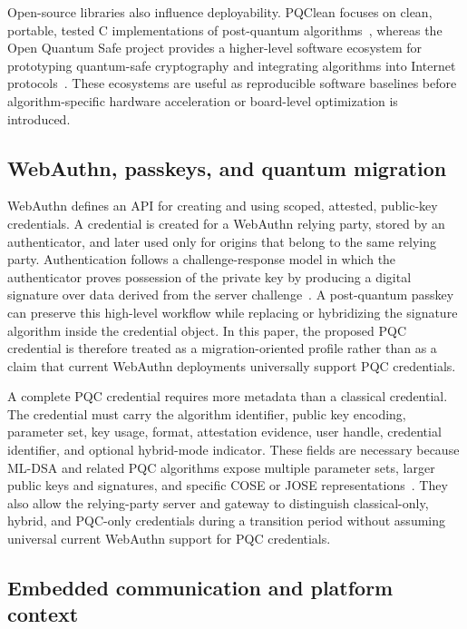 \documentclass[conference,10pt,letterpaper]{IEEEtran}
\begin{document}
Open-source libraries also influence deployability. PQClean focuses on clean, portable, tested C implementations of post-quantum algorithms~\cite{kannwischer2022}, whereas the Open Quantum Safe project provides a higher-level software ecosystem for prototyping quantum-safe cryptography and integrating algorithms into Internet protocols~\cite{stebila2017}. These ecosystems are useful as reproducible software baselines before algorithm-specific hardware acceleration or board-level optimization is introduced.

\subsection{WebAuthn, passkeys, and quantum migration}

WebAuthn defines an API for creating and using scoped, attested, public-key credentials. A credential is created for a WebAuthn relying party, stored by an authenticator, and later used only for origins that belong to the same relying party. Authentication follows a challenge-response model in which the authenticator proves possession of the private key by producing a digital signature over data derived from the server challenge~\cite{webauthn2026}. A post-quantum passkey can preserve this high-level workflow while replacing or hybridizing the signature algorithm inside the credential object. In this paper, the proposed PQC credential is therefore treated as a migration-oriented profile rather than as a claim that current WebAuthn deployments universally support PQC credentials.

A complete PQC credential requires more metadata than a classical credential. The credential must carry the algorithm identifier, public key encoding, parameter set, key usage, format, attestation evidence, user handle, credential identifier, and optional hybrid-mode indicator. These fields are necessary because ML-DSA and related PQC algorithms expose multiple parameter sets, larger public keys and signatures, and specific COSE or JOSE representations~\cite{rfc9964}. They also allow the relying-party server and gateway to distinguish classical-only, hybrid, and PQC-only credentials during a transition period without assuming universal current WebAuthn support for PQC credentials.

\subsection{Embedded communication and platform context}
\end{document}
